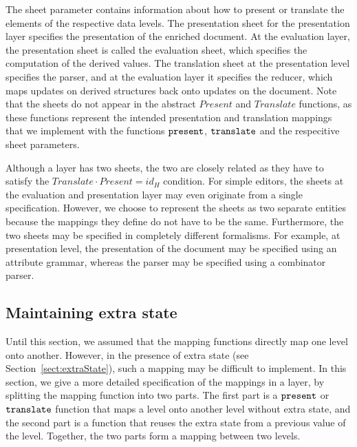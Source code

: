 The sheet parameter contains information about how to present or translate the elements of the respective data levels. The presentation sheet for the presentation layer specifies the presentation of the enriched document. At the evaluation layer, the presentation sheet is called the evaluation sheet, which specifies the computation of the derived values. The translation sheet at the presentation level specifies the parser, and at the evaluation layer it specifies the reducer, which maps updates on derived structures back onto updates on the document. Note that the sheets do not appear in the abstract $Present$ and $Translate$ functions, as these functions represent the intended presentation and translation mappings that we implement with the functions 
${\tt present}$, ${\tt translate}$ and the respecitive sheet parameters.

Although a layer has two sheets, the two are closely related as they have to satisfy the
$Translate \cdot Present = id_{H}$ condition. For simple editors, the sheets at the evaluation and presentation layer may even originate from a single specification. However, we choose to represent the sheets as two separate entities because the mappings they define do not have to be the same.  Furthermore, the two sheets may be specified in completely different formalisms. For example, at presentation level, the presentation of the document may be specified using an attribute grammar, whereas the parser may be specified using a combinator parser\cite{combinatorparser}.



%																
%																
%																
\subsection{Maintaining extra state} \label{sect:maintainingExtraState}

Until this section, we assumed that the mapping functions directly map one level onto another. However, in the presence of extra state (see Section~\ref{sect:extraState}), such a mapping may be difficult to implement. In this section, we give a more detailed specification of the mappings in a layer, by splitting the mapping function into two parts. The first part is a ${\tt present}$ or ${\tt translate}$ function that maps a level onto another level without extra state, and the second part is a function that reuses the extra state from a previous value of the level. Together, the two parts form a mapping between two levels.


